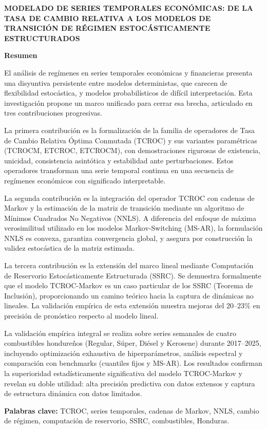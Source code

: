 \let\cleardoublepage\clearpage
{}
\renewcommand{\abstractname}{Resumen}


\thispagestyle{plain}
\begin{center}
    \textbf{MODELADO DE SERIES TEMPORALES ECONÓMICAS: DE LA TASA DE CAMBIO RELATIVA A LOS MODELOS DE TRANSICIÓN DE RÉGIMEN ESTOCÁSTICAMENTE ESTRUCTURADOS}

        \vspace{0.9cm}
    \textbf{Resumen}
\end{center}

El análisis de regímenes en series temporales económicas y financieras presenta una disyuntiva persistente entre modelos deterministas, que carecen de flexibilidad estocástica, y modelos probabilísticos de difícil interpretación.  Esta investigación propone un marco unificado para cerrar esa brecha, articulado en tres contribuciones progresivas.

La primera contribución es la formalización de la familia de operadores de Tasa de Cambio Relativa Óptima Conmutada (TCROC) y sus variantes paramétricas (TCROCM, ETCROC, ETCROCM), con demostraciones rigurosas de existencia, unicidad, consistencia asintótica y estabilidad ante perturbaciones.  Estos operadores transforman una serie temporal continua en una secuencia de regímenes económicos con significado interpretable.

La segunda contribución es la integración del operador TCROC con cadenas de Markov y la estimación de la matriz de transición mediante un algoritmo de Mínimos Cuadrados No Negativos (NNLS).  A diferencia del enfoque de máxima verosimilitud utilizado en los modelos Markov-Switching (MS-AR), la formulación NNLS es convexa, garantiza convergencia global, y asegura por construcción la validez estocástica de la matriz estimada.

La tercera contribución es la extensión del marco lineal mediante Computación de Reservorio Estocásticamente Estructurada (SSRC).  Se demuestra formalmente que el modelo TCROC-Markov es un caso particular de los SSRC (Teorema de Inclusión), proporcionando un camino teórico hacia la captura de dinámicas no lineales.  La validación empírica de esta extensión muestra mejoras del 20--23\% en precisión de pronóstico respecto al modelo lineal.

La validación empírica integral se realiza sobre series semanales de cuatro combustibles hondureños (Regular, Súper, Diésel y Kerosene) durante 2017--2025, incluyendo optimización exhaustiva de hiperparámetros, análisis espectral y comparación con benchmarks (cuantiles fijos y MS-AR).  Los resultados confirman la superioridad estadísticamente significativa del modelo TCROC-Markov y revelan su doble utilidad: alta precisión predictiva con datos extensos y captura de estructura dinámica con datos limitados.

\textbf{Palabras clave:} TCROC, series temporales, cadenas de Markov, NNLS, cambio de régimen, computación de reservorio, SSRC, combustibles, Honduras.
